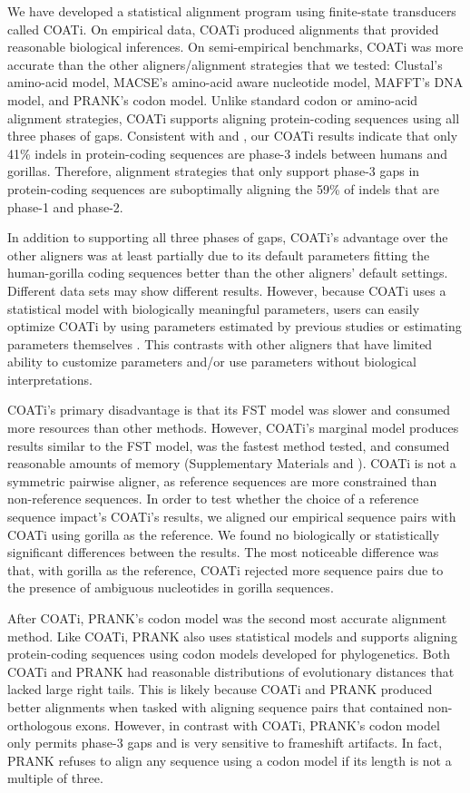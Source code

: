 \documentclass[12pt,letterpaper]{article}
\begin{document}
We have developed a statistical alignment program using finite-state transducers called COATi. On empirical data, COATi produced alignments that provided reasonable biological inferences. On semi-empirical benchmarks, COATi was more accurate than the other aligners/alignment strategies that we tested: Clustal\textOmega{}'s amino-acid model, MACSE's amino-acid aware nucleotide model, MAFFT's DNA model, and PRANK's codon model. Unlike standard codon or amino-acid alignment strategies, COATi supports aligning protein-coding sequences using all three phases of gaps. Consistent with \cite{taylor2004occurrence} and \cite{zhu2022profiling}, our COATi results indicate that only 41\% indels in protein-coding sequences are phase-3 indels between humans and gorillas. Therefore, alignment strategies that only support phase-3 gaps in protein-coding sequences are suboptimally aligning the 59\% of indels that are phase-1 and phase-2.

In addition to supporting all three phases of gaps, COATi's advantage over the other aligners was at least partially due to its default parameters fitting the human-gorilla coding sequences better than the other aligners' default settings. Different data sets may show different results. However, because COATi uses a statistical model with biologically meaningful parameters, users can easily optimize COATi by using parameters estimated by previous studies or estimating parameters themselves \citep[e.g.][]{zhu2022profiling}. This contrasts with other aligners that have limited ability to customize parameters and/or use parameters without biological interpretations.

COATi's primary disadvantage is that its FST model was slower and consumed more resources than other methods. However, COATi's marginal model produces results similar to the FST model, was the fastest method tested, and consumed reasonable amounts of memory (Supplementary Materials and \citealt{garcia2023dissertation}).
%
COATi is not a symmetric pairwise aligner, as reference sequences are more constrained than non-reference sequences. In order to test whether the choice of a reference sequence impact's COATi's results, we aligned our empirical sequence pairs with COATi using gorilla as the reference. We found no biologically or statistically significant differences between the results. The most noticeable difference was that, with gorilla as the reference, COATi rejected more sequence pairs due to the presence of ambiguous nucleotides in gorilla sequences.

After COATi, PRANK's codon model was the second most accurate alignment method. Like COATi, PRANK also uses statistical models and supports aligning protein-coding sequences using codon models developed for phylogenetics. Both COATi and PRANK had reasonable distributions of evolutionary distances that lacked large right tails. This is likely because COATi and PRANK produced better alignments when tasked with aligning sequence pairs that contained non-orthologous exons. However, in contrast with COATi, PRANK's codon model only permits phase-3 gaps and is very sensitive to frameshift artifacts. In fact, PRANK refuses to align any sequence using a codon model if its length is not a multiple of three.
\end{document}
